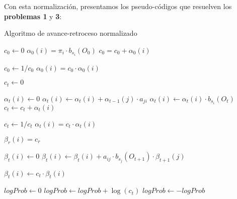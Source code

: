 Con esta normalización, presentamos los pseudo-códigos que resuelven los \textbf{problemas 1} y \textbf{3}: \medskip
\begin{breakablealgorithm}
\caption{Algoritmo de avance-retroceso normalizado} \label{PseudocódigoForwardBackwardNormalizado}

\begin{algorithmic}[1]

    \State $c_0 \gets 0$
        \State $\alpha_0(i)=\pi_i\cdot b_{s_i}(O_0)$
        \State $c_0=c_0+\alpha_0(i)$
    \EndFor \State

    \State $c_0 \gets 1/c_0$
        \State $\alpha_0(i)=c_0\cdot\alpha_0(i)$
    \EndFor \State
    
    
        \State $c_t \gets 0$
    
            \State $\alpha_t(i) \gets 0$
                \State $\alpha_t(i)\gets\alpha_t(i)+\alpha_{t-1}(j)\cdot a_{ji}$
            \EndFor
            \State $\alpha_t(i) \gets \alpha_t(i)\cdot b_{s_i}(O_t)$\;
            \State $c_t \gets c_t+\alpha_t(i)$
        \EndFor \State
     
        \State $c_t \gets 1/c_t$
            \State $\alpha_t(i)=c_t\cdot\alpha_t(i)$
        \EndFor 
    \EndFor \State
    
        \State $\beta_r(i)=c_r$
    \EndFor \State
    
                \State $\beta_t(i) \gets 0$
                    \State$\beta_t(i)\gets \beta_t(i)+a_{ij}\cdot b_{s_j}(O_{t+1})\cdot\beta_{t+1}(j)$
                \EndFor \State
                
                \State $\beta_t(i) \gets c_t\cdot\beta_t(i)$
        \EndFor
    \EndFor \State
    
    \State $logProb\gets0$
        \State $logProb\gets logProb+\log(c_t)$
    \EndFor
    \State $logProb\gets-logProb$
\end{algorithmic}
\end{breakablealgorithm}

